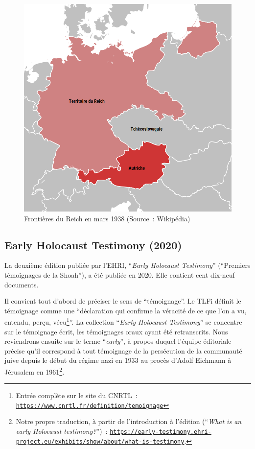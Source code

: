\begin{figure}[h]
    \centering
    \includegraphics[width=0.8\linewidth]{2-MAIN/images/carte-anschluss.png}
    \caption{Frontières du Reich en mars 1938 (Source~: Wikipédia)}
    \label{fig:anschluss}
\end{figure}

\bigskip
\bigskip
\bigskip
\bigskip
\bigskip

\subsection{Early Holocaust Testimony (2020)}
La deuxième édition publiée par l'EHRI, \enquote{\textit{Early Holocaust Testimony}} (\enquote{Premiers témoignages de la Shoah}), a été publiée en 2020. Elle contient cent dix-neuf documents.  

Il convient tout d'abord de préciser le sens de \enquote{témoignage}. Le TLFi définit le témoignage comme une \enquote{déclaration qui confirme la véracité de ce que l'on a vu, entendu, perçu, vécu\footnote{Entrée complète sur le site du CNRTL~: \texttt{\href{https://www.cnrtl.fr/definition/temoignage}{https://www.cnrtl.fr/definition/temoignage}}}}. La collection \enquote{\textit{Early Holocaust Testimony}} se concentre sur le témoignage écrit, les témoignages oraux ayant été retranscrits. Nous reviendrons ensuite sur le terme \enquote{\textit{early}}, à propos duquel l'équipe éditoriale précise qu'il correspond à tout témoignage de la persécution de la communauté juive depuis le début du régime nazi en 1933 au procès d'Adolf Eichmann à Jérusalem en 1961\footnote{Notre propre traduction, à partir de l'introduction à l'édition (\enquote{\textit{What is an early Holocaust testimony?}})~: \texttt{\href{https://early-testimony.ehri-project.eu/exhibits/show/about/what-is-testimony}{https://early-testimony.ehri-project.eu/exhibits/show/about/what-is-testimony}}.}.


